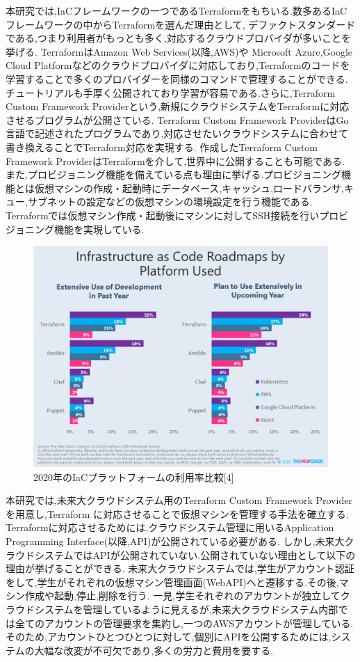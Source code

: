 \documentclass[11pt]{ujarticle}\sloppy
\begin{document}
本研究では,IaCフレームワークの一つであるTerraformをもちいる.数多あるIaCフレームワークの中からTerraformを選んだ理由として,
デファクトスタンダードである,つまり利用者がもっとも多く,対応するクラウドプロバイダが多いことを挙げる.
TerraformはAmazon Web Services(以降,AWS)や
Microsoft Azure,Google Cloud Platformなどのクラウドプロバイダに対応しており,Terraformのコードを学習することで多くのプロバイダーを同様のコマンドで管理することができる.
チュートリアルも手厚く公開されており学習が容易である.さらに,Terraform Custom Framework Providerという,新規にクラウドシステムをTerraformに対応させるプログラムが公開さている.
Terraform Custom Framework ProviderはGo言語で記述されたプログラムであり,対応させたいクラウドシステムに合わせて書き換えることでTerraform対応を実現する.
作成したTerraform Custom Framework ProviderはTerraformを介して,世界中に公開することも可能である.
また,プロビジョニング機能を備えている点も理由に挙げる.プロビジョニング機能とは仮想マシンの作成・起動時にデータベース,キャッシュ,ロードバランサ,キュー,サブネットの設定などの仮想マシンの環境設定を行う機能である.
Terraformでは仮想マシン作成・起動後にマシンに対してSSH接続を行いプロビジョニング機能を実現している.


\begin{figure}[h]
	\includegraphics[width=1\linewidth]{./images/terraform.png}
	\caption{2020年のIaCプラットフォームの利用率比較[4]}
  \label{fig:terraform}
\end{figure}


本研究では,未来大クラウドシステム用のTerraform Custom Framework Providerを用意し,Terraform に対応させることで仮想マシンを管理する手法を確立する.
Terraformに対応させるためには,クラウドシステム管理に用いるApplication Programming Interface(以降,API)が公開されている必要がある.
しかし,未来大クラウドシステムではAPIが公開されていない.公開されていない理由として以下の理由が挙げることができる.
未来大クラウドシステムでは,学生がアカウント認証をして,学生がそれぞれの仮想マシン管理画面(WebAPI)へと遷移する.その後,マシン作成や起動,停止,削除を行う.
一見,学生それぞれのアカウントが独立してクラウドシステムを管理しているように見えるが,未来大クラウドシステム内部では全てのアカウントの管理要求を集約し,一つのAWSアカウントが管理している.
そのため,アカウントひとつひとつに対して,個別にAPIを公開するためには,システムの大幅な改変が不可欠であり,多くの労力と費用を要する.
\end{document}
